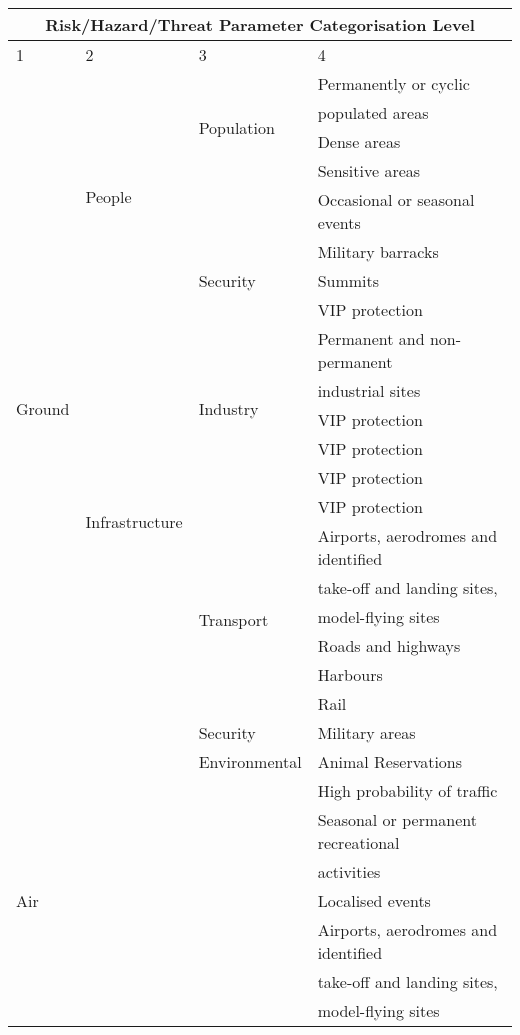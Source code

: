 \documentclass{ua_wgs_base}
\begin{document}
\begin{table}[tbh]
\small
\ttfamily
\begin{centering}
\begin{longtable}{|l|l|l|l|}
 \hline
 \multicolumn{4}{|c|}{Risk/Hazard/Threat Parameter Categorisation Level} \\
 \hline
 1 & 2 & 3 & 4 \\
 \hline
 \multirow{21}{3em}{Ground} & \multirow{8}{7em}{People}  & \multirow{4}{5em}{Population} & Permanently or cyclic \\
  & & & populated areas \\\cline{4-4}
  & & & Dense areas \\\cline{4-4}
  & & & Sensitive areas \\\cline{4-4}
  & & & Occasional or seasonal events \\\cline{3-4}
  & & \multirow{3}{5em}{Security} & Military barracks \\
  & & & Summits \\
  & & & VIP protection \\\cline{2-4}
  & \multirow{12}{5em}{Infrastructure} & \multirow{5}{3em}{Industry} & Permanent and non-permanent \\
  & & & industrial sites \\\cline{4-4}
  & & & VIP protection \\\cline{4-4}
  & & & VIP protection \\\cline{4-4}
  & & & VIP protection \\\cline{4-4}
  & & & VIP protection \\\cline{3-4}
  & & \multirow{6}{5em}{Transport} & Airports, aerodromes and identified \\
  & & & take-off and landing sites, \\
  & & & model-flying sites \\\cline{4-4}
  & & & Roads and highways \\\cline{4-4}
  & & & Harbours \\\cline{4-4}
  & & & Rail \\\cline{3-4}
  & & Security & Military areas \\\cline{3-4}
  & & Environmental & Animal Reservations \\\cline{1-4}
 \multirow{7}{3em}{Air} & & & High probability of traffic \\\cline{4-4}
  & & & Seasonal or permanent recreational \\
  & & & activities \\\cline{4-4}
  & & & Localised events \\\cline{4-4}
  & & & Airports, aerodromes and identified  \\
  & & & take-off and landing sites,  \\
  & & & model-flying sites \\

\hline
\end{longtable}
\end{centering}
\end{table}
\end{document}
